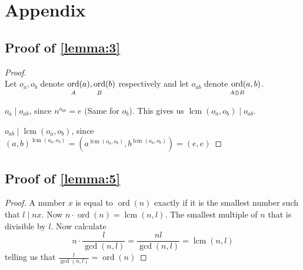 \documentclass{article}
\newcommand{\ordgroup}[1]{\ord_{\rule{0pt}{8pt}\mathclap{#1}}}
\DeclareMathOperator{\ordb}{ord}
\newcommand{\ord}{\mathop{\ordb}\limits}
\DeclareMathOperator{\lcm}{lcm}
\newenvironment{pg}{

}{

\medskip

}
\begin{document}
	\section{Appendix}\label{sec:appendix}
	
	\subsection{\texorpdfstring{Proof of \cref{lemma:3}}{Proof of Lemma 3}}\label{sec:proveLemmaThree}
	
	\usebox{\proveLemmaThree}
	
	\begin{proof} \rule{0pt}{0pt}\\
		Let $o_a, o_b$ denote $\ordgroup{A}(a), \ordgroup{B}(b)$ respectively and let $o_{ab}$ denote $\ordgroup{A \oplus B}(a,b)$.
		\begin{pg}
			$o_a \mid o_{ab}$, since $n^{o_{ab}} = e$ (Same for $o_b$). This gives us $\lcm(o_a, o_b) \mid o_{ab}$.
		\end{pg}
		\begin{pg}
			$o_{ab} \mid \lcm(o_a, o_b)$, since $(a,b)^{\lcm(o_a, o_b)} = (a^{\lcm(o_a, o_b)}, b^{\lcm(o_a, o_b)}) = (e,e)$
		\end{pg}
	\end{proof}
	
	\subsection{\texorpdfstring{Proof of \cref{lemma:5}}{Proof of Lemma 5}}\label{sec:proveLemmaFive}
	
	\usebox{\proveLemmaFive}
	
	\begin{proof}
		A number $x$ is equal to $\ord(n)$ exactly if it is the smallest number such that $l \mid nx$. Now $n · \ord(n) = \lcm(n, l)$. The smallest multiple of $n$ that is divisible by $l$.
		Now calculate
		\begin{equation*}
			n · \frac{l}{\gcd(n,l)} = \frac{nl}{\gcd(n,l)} = \lcm(n,l)
		\end{equation*}
		telling us that $\frac{l}{\gcd(n,l)} = \ord(n)$
	\end{proof}
	
	\printbibliography
\end{document}
